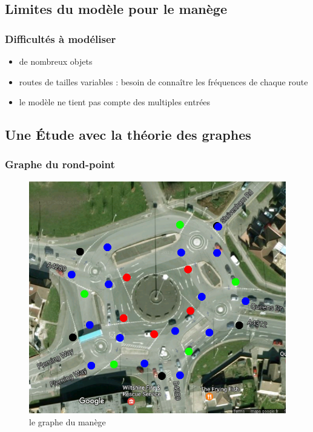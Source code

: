 \documentclass[slidetop,11pt]{beamer}
\begin{document}
	\subsection{Limites du modèle pour le manège}
	
\begin{frame}
	\frametitle{Difficultés à modéliser}
	\begin{itemize}
		\item de nombreux objets
		\item routes de tailles variables : besoin de connaître les fréquences de chaque route
		\item le modèle ne tient pas compte des multiples entrées
	\end{itemize}
\end{frame}
	\subsection{Une Étude avec la théorie des graphes}

\begin{frame}
	\frametitle{Graphe du rond-point}
	\begin{figure}
		\begin{center}
			\includegraphics[scale=0.3]{../manege-graphe}
		\end{center}
		\caption{le graphe du manège}
	\end{figure}
\end{frame}
\end{document}
